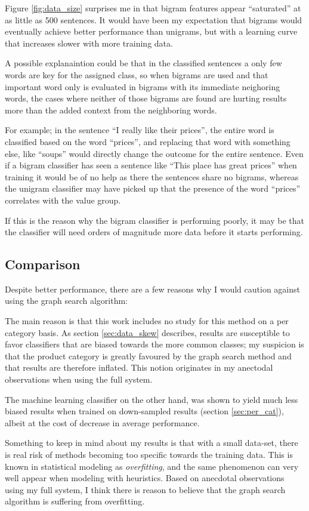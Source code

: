 \documentclass[a4paper,11pt]{kth-mag}
\begin{document}
Figure \ref{fig:data_size} surprises me in that bigram features appear ``saturated'' at as little as 500 sentences.
It would have been my expectation that bigrams would eventually achieve better performance than unigrams, but
with a learning curve that increases slower with more training data.

A possible explanaintion could be that in the classified sentences a only few words are key for the assigned class,
so when bigrams are used and that important word only is evaluated in bigrams with its immediate neighoring words,
the cases where neither of those bigrams are found are hurting results more than the added context from the neighboring words.

For example; in the sentence ``I really like their prices'', the entire word is classified based on the word ``prices'', and replacing that word with something else, like ``soups'' would directly change the outcome for the entire sentence. Even if a bigram classifier has seen a sentence like ``This place has great prices'' when training it would be of no help as there the sentences share no bigrams, whereas the unigram classifier may have picked up that the presence of the word ``prices'' correlates with the value group.

If this is the reason why the bigram classifier is performing poorly, it may be that the classifier will need orders
of magnitude more data before it starts performing.


\subsection{Comparison}
Despite better performance, there are a few reasons why I would caution against using the graph search algorithm:

The main reason is that this work includes no study for this method on a per category basis.
As section \ref{sec:data_skew} describes, results are
susceptible to favor classifiers that are biased towards the more common classes; my suspicion is that
the product category is greatly favoured by the graph search method and that results are therefore inflated.
This notion originates in my anectodal observations when using the full system.

The machine learning classifier on the other hand, was shown to yield much less biased results
when trained on down-sampled results (section \ref{sec:per_cat}), albeit at the cost of
decrease in average performance.

Something to keep in mind about my results is that with a small data-set,
there is real risk of methods becoming too specific towards the training data.
This is known in statistical modeling as \emph{overfitting},
and the same phenomenon can very well appear when modeling with heuristics.
Based on anecdotal observations using my full system, I think there is reason to believe that
the graph search algorithm is suffering from overfitting.
\end{document}
